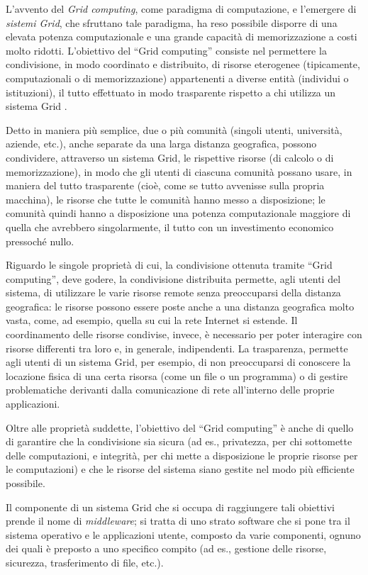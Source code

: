 L'avvento del \emph{Grid computing}, come paradigma di computazione, e l'emergere di \emph{sistemi Grid}, che sfruttano tale paradigma, ha reso possibile disporre di una elevata potenza computazionale e una grande capacit\`a di memorizzazione a costi molto ridotti.
L'obiettivo del ``Grid computing'' consiste nel permettere la condivisione, in modo coordinato e distribuito, di risorse eterogenee (tipicamente, computazionali o di memorizzazione) appartenenti a diverse entit\`a (individui o istituzioni), il tutto effettuato in modo trasparente rispetto a chi utilizza un sistema Grid \cite{Foster2001Anatomy}.

Detto in maniera pi\`u semplice, due o pi\`u comunit\`a (singoli utenti, universit\`a, aziende, etc.), anche separate da una larga distanza geografica, possono condividere, attraverso un sistema Grid, le rispettive risorse (di calcolo o di memorizzazione), in modo che gli utenti di ciascuna comunit\`a possano usare, in maniera del tutto trasparente (cio\`e, come se tutto avvenisse sulla propria macchina), le risorse che tutte le comunit\`a hanno messo a disposizione; le comunit\`a quindi hanno a disposizione una potenza computazionale maggiore di quella che avrebbero singolarmente, il tutto con un investimento economico pressoch\'e nullo.

Riguardo le singole propriet\`a di cui, la condivisione ottenuta tramite ``Grid computing'', deve godere, la condivisione distribuita permette, agli utenti del sistema, di utilizzare le varie risorse remote senza preoccuparsi della distanza geografica: le risorse possono essere poste anche a una distanza geografica molto vasta, come, ad esempio, quella su cui la rete Internet si estende.
Il coordinamento delle risorse condivise, invece, \`e necessario per poter interagire con risorse differenti tra loro e, in generale, indipendenti.
La trasparenza, permette agli utenti di un sistema Grid, per esempio, di non preoccuparsi di conoscere la locazione fisica di una certa risorsa (come un file o un programma) o di gestire problematiche derivanti dalla comunicazione di rete all'interno delle proprie applicazioni.

Oltre alle propriet\`a suddette, l'obiettivo del ``Grid computing'' \`e anche di quello di garantire che la condivisione sia sicura (ad es., privatezza, per chi sottomette delle computazioni, e integrit\`a, per chi mette a disposizione le proprie risorse per le computazioni) e che le risorse del sistema siano gestite nel modo pi\`u efficiente possibile.

Il componente di un sistema Grid che si occupa di raggiungere tali obiettivi prende il nome di \emph{middleware}; si tratta di uno strato software che si pone tra il sistema operativo e le applicazioni utente, composto da varie componenti, ognuno dei quali \`e preposto a uno specifico compito (ad es., gestione delle risorse, sicurezza, trasferimento di file, etc.).

